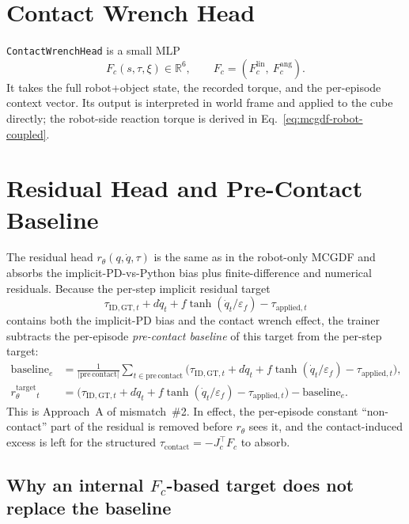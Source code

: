 \documentclass[11pt]{article}
\begin{document}
\section{Contact Wrench Head}

\texttt{ContactWrenchHead} is a small MLP
\begin{equation}
  F_c(s,\tau,\xi) \in \mathbb{R}^6,
  \qquad F_c = (F_c^{\mathrm{lin}},\ F_c^{\mathrm{ang}}).
\end{equation}
It takes the full robot+object state, the recorded torque, and the
per-episode context vector. Its output is interpreted in world frame and
applied to the cube directly; the robot-side reaction torque is derived in
Eq.~\eqref{eq:mcgdf-robot-coupled}.

\section{Residual Head and Pre-Contact Baseline}

The residual head $r_\theta(q,\dot q,\tau)$ is the same as in the robot-only
MCGDF and absorbs the implicit-PD-vs-Python bias plus finite-difference and
numerical residuals.  Because the per-step implicit residual target
\begin{equation*}
  \tau_{\mathrm{ID,GT},t} + d\dot q_t + f\tanh(\dot q_t/\varepsilon_f) - \tau_{\mathrm{applied},t}
\end{equation*}
contains both the implicit-PD bias and the contact wrench effect, the
trainer subtracts the per-episode \emph{pre-contact baseline} of this target
from the per-step target:
\begin{align}
  \mathrm{baseline}_e
  &= \frac{1}{|\mathrm{pre\,contact}|}
     \sum_{t\in\mathrm{pre\,contact}}
     \bigl(\tau_{\mathrm{ID,GT},t} + d\dot q_t + f\tanh(\dot q_t/\varepsilon_f) - \tau_{\mathrm{applied},t}\bigr),
  \\
  r_\theta^{\mathrm{target}}_t
  &= \bigl(\tau_{\mathrm{ID,GT},t} + d\dot q_t + f\tanh(\dot q_t/\varepsilon_f) - \tau_{\mathrm{applied},t}\bigr)
     - \mathrm{baseline}_e.
\end{align}
This is Approach~A of mismatch~\#2.  In effect, the per-episode constant
``non-contact'' part of the residual is removed before $r_\theta$ sees it,
and the contact-induced excess is left for the structured
$\tau_{\mathrm{contact}} = -J_c^\top F_c$ to absorb.

\subsection{Why an internal \texorpdfstring{$F_c$}{F\_c}-based target does
not replace the baseline}
\label{sec:residual-identifiability}
\end{document}
